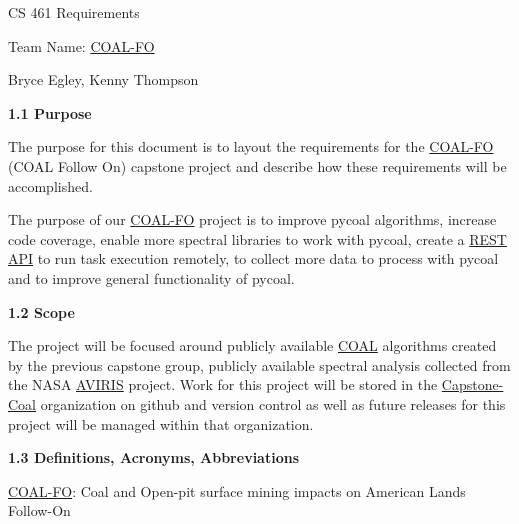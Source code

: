 \documentclass[a4paper,12pt]{article}
\begin{document}
\sloppy

\noindent CS 461 Requirements\newline


\noindent Team Name: \href{http://eecs.oregonstate.edu/capstone/submission/?page=preview\&pid=320}{COAL-FO}\newline


\noindent Bryce Egley, Kenny Thompson\newline


\newline


\noindent \textbf{1.1 Purpose}\newline


\noindent The purpose for this document is to layout the requirements for the \href{http://eecs.oregonstate.edu/capstone/submission/?page=preview\&pid=320}{COAL-FO} (COAL Follow On) capstone project and describe how these requirements will be accomplished. \newline

\noindent The purpose of our \href{http://eecs.oregonstate.edu/capstone/submission/?page=preview\&pid=320}{COAL-FO} project is to improve pycoal algorithms, increase code coverage, enable more spectral libraries to work with pycoal, create a \href{https://restfulapi.net/}{REST API} to run task execution remotely, to collect more data to process with pycoal and to improve general functionality of pycoal. \newline

\noindent \textbf{1.2 Scope}\newline


\noindent The project will be focused around publicly available \href{https://capstone-coal.github.io/}{COAL} algorithms created by the previous capstone group, publicly available spectral analysis collected from the NASA \href{https://aviris.jpl.nasa.gov/}{AVIRIS} project. Work for this project will be stored in the \href{https://github.com/capstone-coal}{Capstone-Coal} organization on github and version control as well as future releases for this project will be managed within that organization.\newline


\noindent \textbf{1.3 Definitions, Acronyms, Abbreviations}\newline


\noindent \href{http://eecs.oregonstate.edu/capstone/submission/?page=preview\&pid=320}{COAL-FO}: Coal and Open-pit surface mining impacts on American Lands Follow-On\newline
\end{document}
